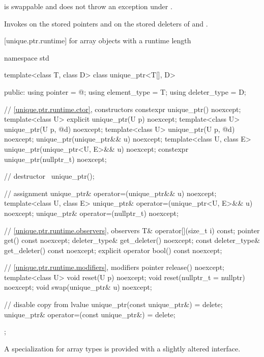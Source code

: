 \begin{itemdescr}
\pnum
\expects
{} is swappable and
does not throw an exception under .

\pnum
\effects
Invokes  on the stored pointers and on the stored
deleters of  and .
\end{itemdescr}

[unique.ptr.runtime]{ for array objects with a runtime length}

%
\begin{codeblock}
namespace std {
  template<class T, class D> class unique_ptr<T[], D> {
  public:
    using pointer      = @\seebelow@;
    using element_type = T;
    using deleter_type = D;

    // \ref{unique.ptr.runtime.ctor}, constructors
    constexpr unique_ptr() noexcept;
    template<class U> explicit unique_ptr(U p) noexcept;
    template<class U> unique_ptr(U p, @\seebelow@ d) noexcept;
    template<class U> unique_ptr(U p, @\seebelow@ d) noexcept;
    unique_ptr(unique_ptr&& u) noexcept;
    template<class U, class E>
      unique_ptr(unique_ptr<U, E>&& u) noexcept;
    constexpr unique_ptr(nullptr_t) noexcept;

    // destructor
    ~unique_ptr();

    // assignment
    unique_ptr& operator=(unique_ptr&& u) noexcept;
    template<class U, class E>
      unique_ptr& operator=(unique_ptr<U, E>&& u) noexcept;
    unique_ptr& operator=(nullptr_t) noexcept;

    // \ref{unique.ptr.runtime.observers}, observers
    T& operator[](size_t i) const;
    pointer get() const noexcept;
    deleter_type& get_deleter() noexcept;
    const deleter_type& get_deleter() const noexcept;
    explicit operator bool() const noexcept;

    // \ref{unique.ptr.runtime.modifiers}, modifiers
    pointer release() noexcept;
    template<class U> void reset(U p) noexcept;
    void reset(nullptr_t = nullptr) noexcept;
    void swap(unique_ptr& u) noexcept;

    // disable copy from lvalue
    unique_ptr(const unique_ptr&) = delete;
    unique_ptr& operator=(const unique_ptr&) = delete;
  };
}
\end{codeblock}

\pnum
A specialization for array types is provided with a slightly altered
interface.


